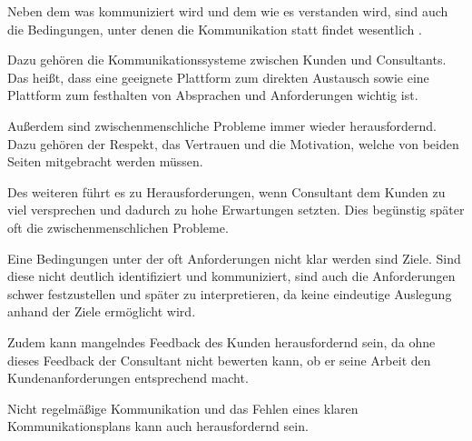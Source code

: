 \documentclass[../main.tex]{subfiles}
\begin{document}
Neben dem was kommuniziert wird und dem wie es verstanden wird, sind auch die Bedingungen, unter denen die Kommunikation statt findet wesentlich \autocite{cornelissen2023corporate}.

Dazu gehören die Kommunikationssysteme zwischen Kunden und Consultants.
Das heißt, dass eine geeignete Plattform zum direkten Austausch sowie eine Plattform zum festhalten von Absprachen und Anforderungen wichtig ist.
\autocite{gamil2017identification,bjarnason2017role}

Außerdem sind zwischenmenschliche Probleme immer wieder herausfordernd.
Dazu gehören der Respekt, das Vertrauen und die Motivation, welche von beiden Seiten mitgebracht werden müssen.
\autocite{mackenzie19597,appelbaum2005critical,bjarnason2017role}

Des weiteren führt es zu Herausforderungen, wenn Consultant dem Kunden zu viel versprechen und dadurch zu hohe Erwartungen setzten.
Dies begünstig später oft die zwischenmenschlichen Probleme.
\autocite{mackenzie19597,appelbaum2005critical}

Eine Bedingungen unter der oft Anforderungen nicht klar werden sind Ziele.
Sind diese nicht deutlich identifiziert und kommuniziert, sind auch die Anforderungen schwer festzustellen und später zu interpretieren, da keine eindeutige Auslegung anhand der Ziele ermöglicht wird.
\autocite{cothran2005developing,appelbaum2005critical}

Zudem kann mangelndes Feedback des Kunden herausfordernd sein, da ohne dieses Feedback der Consultant nicht bewerten kann, ob er seine Arbeit den Kundenanforderungen entsprechend macht.
\autocite{bano2014aligning,reihlen2010knowledge}

Nicht regelmäßige Kommunikation und das Fehlen eines klaren Kommunikationsplans kann auch herausfordernd sein.
\autocite{gamil2017identification,bjarnason2017role}
\end{document}
